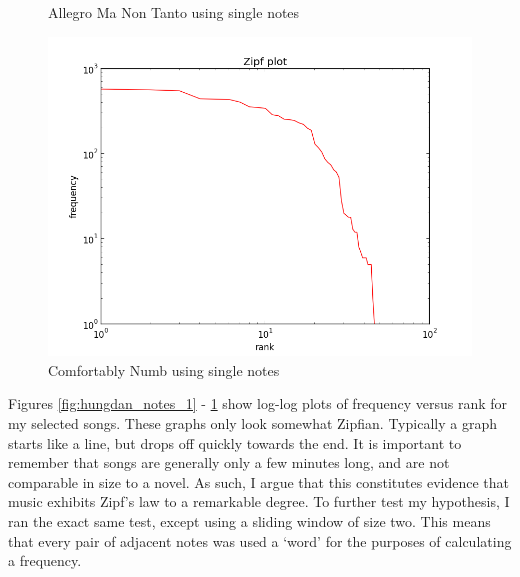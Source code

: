 \documentclass[10pt]{book}
\begin{document}
\begin{figure}[!htb]
  \caption{Allegro Ma Non Tanto using single notes}\label{fig:rach_notes_1}
\endminipage\hfill
{}%
  \includegraphics[width=\linewidth]{comf_notes_1}
  \caption{Comfortably Numb using single notes}\label{fig:comf_notes_1}
\endminipage
\end{figure}

Figures \ref{fig:hungdan_notes_1} - \ref{fig:comf_notes_1} show log-log plots of frequency versus rank for my selected songs. These graphs only look somewhat Zipfian. Typically a graph starts like a line, but drops off quickly towards the end. It is important to remember that songs are generally only a few minutes long, and are not comparable in size to a novel. As such, I argue that this constitutes evidence that music exhibits Zipf's law to a remarkable degree. To further test my hypothesis, I ran the exact same test, except using a sliding window of size two. This means that every pair of adjacent notes was used a `word' for the purposes of calculating a frequency.
\end{document}
